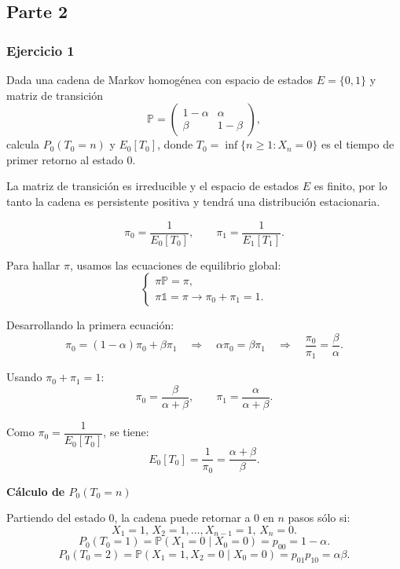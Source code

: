 \subsection{Parte 2}
\subsubsection{Ejercicio 1}
\begin{exercise}
Dada una cadena de Markov homogénea con espacio de estados $E=\{0,1\}$ y matriz de transición
\[
\mathbb{P}=
\begin{pmatrix}
1-\alpha & \alpha \\
\beta & 1-\beta
\end{pmatrix},
\]
calcula $P_0(T_0=n)$ y $E_0[T_0]$, donde $T_0=\inf\{n\ge1 : X_n=0\}$ es el tiempo de primer retorno al estado $0$.
\end{exercise}

La matriz de transición es irreducible y el espacio de estados $E$ es finito, por lo tanto la cadena es persistente positiva y tendrá una distribución estacionaria.

\[
\pi_0=\frac{1}{E_0[T_0]}, \qquad \pi_1=\frac{1}{E_1[T_1]}.
\]

Para hallar $\pi$, usamos las ecuaciones de equilibrio global:
\[
\left\{
\begin{array}{l}
\pi \mathbb{P} = \pi, \\
\pi \mathbb{1}= \pi \longrightarrow \pi_0 + \pi_1 = 1.
\end{array}
\right.
\]

Desarrollando la primera ecuación:
\[
\pi_0 = (1-\alpha)\pi_0 + \beta\pi_1
\quad \Longrightarrow \quad
\alpha\pi_0 = \beta\pi_1
\quad \Longrightarrow \quad
\frac{\pi_0}{\pi_1} = \frac{\beta}{\alpha}.
\]

Usando $\pi_0 + \pi_1 = 1$:
\[
\pi_0 = \frac{\beta}{\alpha+\beta}, \qquad \pi_1 = \frac{\alpha}{\alpha+\beta}.
\]

Como $\pi_0 = \dfrac{1}{E_0[T_0]}$, se tiene:
\[
E_0[T_0] = \frac{1}{\pi_0} = \frac{\alpha+\beta}{\beta}.
\]

\medskip
\textbf{Cálculo de $P_0(T_0=n)$}

Partiendo del estado $0$, la cadena puede retornar a $0$ en $n$ pasos sólo si:
\[
X_1=1, \, X_2=1, \dots, X_{n-1}=1, \, X_n=0.
\]
\[
P_0(T_0=1)=\mathbb{P}(X_1=0\mid X_0=0)=p_{00}=1-\alpha.
\]
\[
P_0(T_0=2)=\mathbb{P}(X_1=1,X_2=0\mid X_0=0)=p_{01}p_{10}=\alpha\beta.
\]

